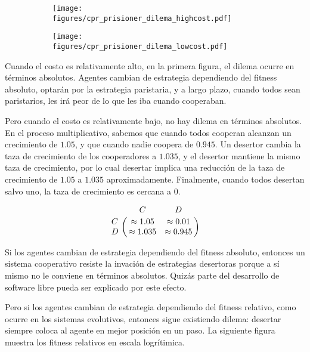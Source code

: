 \documentclass[a4paper,10pt]{article}
\begin{document}
\begin{figure}[H]
    \centering
    \begin{subfigure}[b]{0.45\textwidth}
    \texttt{[image: figures/cpr\_prisioner\_dilema\_highcost.pdf]}
    \end{subfigure}
    \begin{subfigure}[b]{0.45\textwidth}
    \texttt{[image: figures/cpr\_prisioner\_dilema\_lowcost.pdf]}
    \end{subfigure}
    \caption{}
    \label{fig:cpr_cooperation_zoom}
\end{figure}

%

Cuando el costo es relativamente alto, en la primera figura, el dilema ocurre en términos absolutos.
Agentes cambian de estrategia dependiendo del fitness absoluto, optarán por la estrategia paristaria, y a largo plazo, cuando todos sean paristarios, les irá peor de lo que les iba cuando cooperaban.


Pero cuando el costo es relativamente bajo, no hay dilema en términos absolutos.
En el proceso multiplicativo, sabemos que cuando todos cooperan alcanzan un crecimiento de $1.05$, y que cuando nadie coopera de $0.945$.
Un desertor cambia la taza de crecimiento de los cooperadores a $1.035$, y el desertor mantiene la mismo taza de crecimiento, por lo cual desertar implica una reducción de la taza de crecimiento de $1.05$ a $1.035$ aproximadamente.
Finalmente, cuando todos desertan salvo uno, la taza de crecimiento es cercana a $0$.

\begin{equation}
    \bordermatrix{ & C & D \cr
      C & \approx 1.05 & \approx 0.01 \cr
      D & \approx 1.035 & \approx 0.945  } 
\end{equation}

Si los agentes cambian de estrategia dependiendo del fitness absoluto, entonces un sistema cooperativo resiste la invación de estrategias desertoras porque a sí mismo no le conviene en términos absolutos.
Quizás parte del desarrollo de software libre pueda ser explicado por este efecto.


Pero si los agentes cambian de estrategia dependiendo del fitness relativo, como ocurre en los sistemas evolutivos, entonces sigue existiendo dilema: desertar siempre coloca al agente en mejor posición en un paso. 
La siguiente figura muestra los fitness relativos en escala logrítimica.
\end{document}
